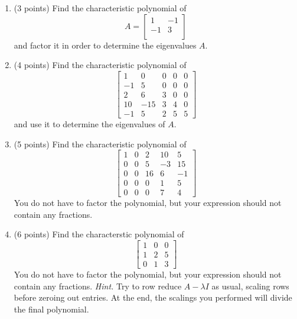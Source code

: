 \documentclass{article}
\theoremstyle{remark}
\begin{document}
\begin{enumerate}
\item (3 points) Find the characteristic polynomial of
  \begin{displaymath}
    A = \begin{bmatrix}
      1 & -1\\
      -1 & 3 \\
    \end{bmatrix}
  \end{displaymath}
  and factor it in order to determine the eigenvalues $A$.
\item (4 points) Find the characteristic polynomial of
  \begin{displaymath}
    \begin{bmatrix}
      1 & 0 & 0 & 0 & 0 \\
      -1 & 5 & 0 & 0 & 0 \\
      2 & 6 & 3 & 0 & 0 \\
      10 & -15 & 3 & 4 & 0 \\
      -1 & 5 & 2 & 5 & 5
    \end{bmatrix}
  \end{displaymath}
  and use it to determine the eigenvalues of $A$.
\item (5 points) Find the characteristic polynomial of
  \begin{displaymath}
    \begin{bmatrix}
      1 & 0 & 2 & 10 & 5 \\
      0 & 0 & 5 & -3 & 15 \\
      0 & 0 & 16 & 6 & -1 \\
      0 & 0 & 0 & 1 & 5\\
      0 & 0 & 0 & 7 & 4
    \end{bmatrix}
  \end{displaymath}
  You do not have to factor the polynomial, but your expression should not contain any fractions.
\item (6 points) Find the characterstic polynomial of
  \begin{displaymath}
    \begin{bmatrix}
      1 & 0 & 0 \\
      1 & 2 & 5 \\
      0 & 1 & 3
    \end{bmatrix}
  \end{displaymath}
  You do not have to factor the polynomial, but your expression should not contain any fractions.
  \textit{Hint.} Try to row reduce $A - \lambda I$ as usual, scaling rows before zeroing out entries.
  At the end, the scalings you performed will divide the final polynomial.
\end{enumerate}
\end{document}
